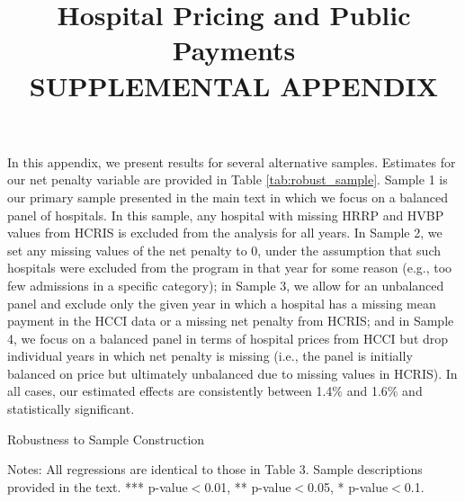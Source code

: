 \documentclass[12pt]{article}
\begin{document}
\title{Hospital Pricing and Public Payments \\ SUPPLEMENTAL APPENDIX}
\author{}
\date{}
\maketitle

In this appendix, we present results for several alternative samples. Estimates for our net penalty variable are provided in Table \ref{tab:robust_sample}. Sample 1 is our primary sample presented in the main text in which we focus on a balanced panel of hospitals. In this sample, any hospital with missing HRRP and HVBP values from HCRIS is excluded from the analysis for all years. In Sample 2, we set any missing values of the net penalty to 0, under the assumption that such hospitals were excluded from the program in that year for some reason (e.g., too few admissions in a specific category); in Sample 3, we allow for an unbalanced panel and exclude only the given year in which a hospital has a missing mean payment in the HCCI data or a missing net penalty from HCRIS; and in Sample 4, we focus on a balanced panel in terms of hospital prices from HCCI but drop individual years in which net penalty is missing (i.e., the panel is initially balanced on price but ultimately unbalanced due to missing values in HCRIS). In all cases, our estimated effects are consistently between 1.4\% and 1.6\% and statistically significant.


\newsavebox{\gfxbox}
\setlength{\captionmargin}{.5 \textwidth} \addtolength{\captionmargin}{-.5\wd\gfxbox}
\begin{table}[!h]
\centering
\caption{Robustness to Sample Construction}
\label{tab:robust_sample}
\usebox{\gfxbox}
\par
\begin{minipage}{\wd\gfxbox}
\footnotesize
Notes: All regressions are identical to those in Table 3. Sample descriptions provided in the text. *** p-value$<$0.01, ** p-value$<$0.05, * p-value$<$0.1.
\end{minipage}
\end{table}
\end{document}
